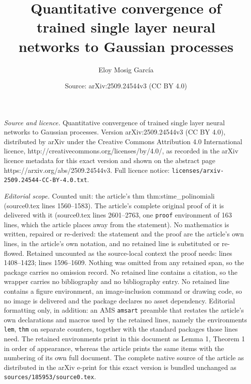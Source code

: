 \documentclass[10pt,a4paper]{amsart}
\title{Quantitative convergence of trained single layer neural networks to Gaussian processes}
\author{Eloy Mosig García}
\date{Source: arXiv:2509.24544v3 (CC BY 4.0)}
\begin{document}
\maketitle

\noindent\emph{Source and licence.} Quantitative convergence of trained single layer neural networks to Gaussian processes. Version arXiv:2509.24544v3 (CC BY 4.0), distributed by arXiv under the Creative Commons Attribution 4.0 International licence, http://creativecommons.org/licenses/by/4.0/, as recorded in the arXiv licence metadata for this exact version and shown on the abstract page https://arxiv.org/abs/2509.24544v3. Full licence notice: \texttt{licenses/arxiv-2509.24544-CC-BY-4.0.txt}.\par\smallskip

\noindent\textit{Editorial scope.} Counted unit: the article's thm thm:stime\_polinomiali (source0.tex lines 1560--1583). The article's complete original proof of it is delivered with it (source0.tex lines 2601--2763, one \texttt{proof} environment of 163 lines, which the article places away from the statement). No mathematics is written, repaired or re-derived: the statement and the proof are the article's own lines, in the article's own notation, and no retained line is substituted or re-flowed.  Retained uncounted as the source-local context the proof needs: lines 1408--1423; lines 1596--1609.  Nothing was omitted from any retained span, so the package carries no omission record.  No retained line contains a citation, so the wrapper carries no bibliography and no bibliography entry.  No retained line contains a figure environment, an image-inclusion command or drawing code, so no image is delivered and the package declares no asset dependency.  Editorial formatting only, in addition: an AMS \texttt{amsart} preamble that restates the article's own declarations and macros used by the retained lines, namely the environments \texttt{lem}, \texttt{thm} on separate counters, together with the standard packages those lines need.  The retained environments print in this document as Lemma 1, Theorem 1 in order of appearance, whereas the article prints the same items with the numbering of its own full document.  The complete native source of the article as distributed in the arXiv e-print for this exact version is bundled unchanged as \texttt{sources/185953/source0.tex}.
\end{document}
